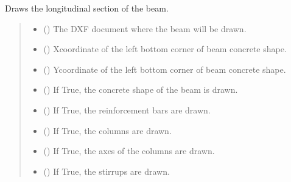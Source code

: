 \documentclass[a4paper,10pt,english]{sphinxmanual}
\begin{document}
\begin{fulllineitems}
\begin{fulllineitems}
\pysigstopsignatures
\sphinxAtStartPar
Draws the longitudinal section of the beam.
\begin{quote}\begin{description}
\begin{itemize}
\item {} 
\sphinxAtStartPar
{} () \textendash{} The DXF document where the beam will be drawn.

\item {} 
\sphinxAtStartPar
{} (\sphinxstyleliteralemphasis{\sphinxupquote{, }}) \textendash{} X\sphinxhyphen{}coordinate of the left bottom corner of beam concrete shape.

\item {} 
\sphinxAtStartPar
{} (\sphinxstyleliteralemphasis{\sphinxupquote{, }}) \textendash{} Y\sphinxhyphen{}coordinate of the left bottom corner of beam concrete shape.

\item {} 
\sphinxAtStartPar
{} () \textendash{} If True, the concrete shape of the beam is drawn.

\item {} 
\sphinxAtStartPar
{} () \textendash{} If True, the reinforcement bars are drawn.

\item {} 
\sphinxAtStartPar
{} () \textendash{} If True, the columns are drawn.

\item {} 
\sphinxAtStartPar
{} () \textendash{} If True, the axes of the columns are drawn.

\item {} 
\sphinxAtStartPar
{} () \textendash{} If True, the stirrups are drawn.


\end{itemize}
\end{description}
\end{quote}
\end{fulllineitems}
\end{fulllineitems}
\end{document}
